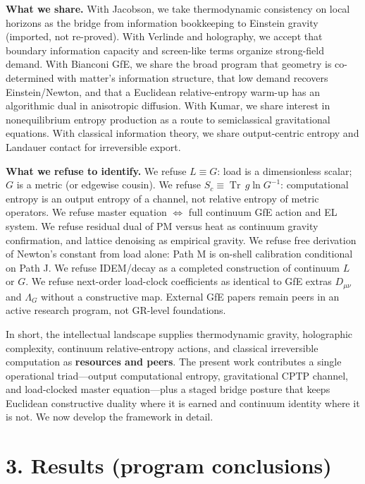 \documentclass[
  11pt,
]{article}
\newcounter{none} %
\begin{document}
\textbf{What we share.} With Jacobson, we take thermodynamic consistency
on local horizons as the bridge from information bookkeeping to Einstein
gravity (imported, not re-proved). With Verlinde and holography, we
accept that boundary information capacity and screen-like terms organize
strong-field demand. With Bianconi GfE, we share the broad program that
geometry is co-determined with matter's information structure, that low
demand recovers Einstein/Newton, and that a Euclidean relative-entropy
warm-up has an algorithmic dual in anisotropic diffusion. With Kumar, we
share interest in nonequilibrium entropy production as a route to
semiclassical gravitational equations. With classical information
theory, we share output-centric entropy and Landauer contact for
irreversible export.

\textbf{What we refuse to identify.} We refuse \(L \equiv G\): load is a
dimensionless scalar; \(G\) is a metric (or edgewise cousin). We refuse
\(S_c \equiv \operatorname{Tr}\, g\ln G^{-1}\): computational entropy is
an output entropy of a channel, not relative entropy of metric
operators. We refuse master equation \(\Leftrightarrow\) full continuum
GfE action and EL system. We refuse residual dual of PM versus heat as
continuum gravity confirmation, and lattice denoising as empirical
gravity. We refuse free derivation of Newton's constant from load alone:
Path M is on-shell calibration conditional on Path J. We refuse
IDEM/decay as a completed construction of continuum \(L\) or \(G\). We
refuse next-order load-clock coefficients as identical to GfE extras
\(D_{\mu\nu}\) and \(\Lambda_G\) without a constructive map. External
GfE papers remain peers in an active research program, not GR-level
foundations.

In short, the intellectual landscape supplies thermodynamic gravity,
holographic complexity, continuum relative-entropy actions, and
classical irreversible computation as \textbf{resources and peers}. The
present work contributes a single operational triad---output
computational entropy, gravitational CPTP channel, and load-clocked
master equation---plus a staged bridge posture that keeps Euclidean
constructive duality where it is earned and continuum identity where it
is not. We now develop the framework in detail.

\section{3. Results (program
conclusions)}\label{results-program-conclusions}
\end{document}
